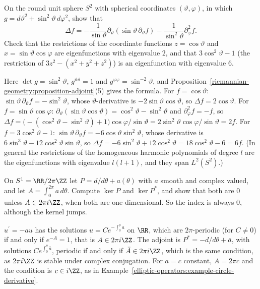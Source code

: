 \begin{exercise}\label{elliptic-operators:exercise-spherical-harmonics}
On the round unit sphere $S^2$ with spherical coordinates $(\vartheta, \varphi)$, in which $g = d\vartheta^2 + \sin^2\vartheta\,d\varphi^2$, show that
\[
\Delta f = -\frac{1}{\sin\vartheta}\partial_\vartheta(\sin\vartheta\,\partial_\vartheta f) - \frac{1}{\sin^2\vartheta}\partial_\varphi^2f .
\]
Check that the restrictions of the coordinate functions $z = \cos\vartheta$ and $x = \sin\vartheta\cos\varphi$ are eigenfunctions with eigenvalue $2$, and that $3\cos^2\vartheta - 1$ (the restriction of
$3z^2 - (x^2 + y^2 + z^2)$) is an eigenfunction with eigenvalue $6$.
\end{exercise}

\begin{solution}
Here $\det g = \sin^2\vartheta$, $g^{\vartheta\vartheta} = 1$ and $g^{\varphi\varphi} = \sin^{-2}\vartheta$, and Proposition~\ref{riemannian-geometry:proposition-adjoint}(5) gives the formula. For $f = \cos\vartheta$:
$\sin\vartheta\,\partial_\vartheta f = -\sin^2\vartheta$, whose $\vartheta$-derivative is $-2\sin\vartheta\cos\vartheta$, so $\Delta f = 2\cos\vartheta$. For $f = \sin\vartheta\cos\varphi$:
$\partial_\vartheta(\sin\vartheta\cos\vartheta) = \cos^2\vartheta - \sin^2\vartheta$ and $\partial_\varphi^2f = -f$, so
$\Delta f = \bigl(-(\cos^2\vartheta - \sin^2\vartheta) + 1\bigr)\cos\varphi/\sin\vartheta = 2\sin^2\vartheta\cos\varphi/\sin\vartheta = 2f$. For $f = 3\cos^2\vartheta - 1$: $\sin\vartheta\,\partial_\vartheta f = -6\cos\vartheta\sin^2\vartheta$,
whose derivative is $6\sin^3\vartheta - 12\cos^2\vartheta\sin\vartheta$, so $\Delta f = -6\sin^2\vartheta + 12\cos^2\vartheta = 18\cos^2\vartheta - 6 = 6f$. (In general the restrictions of the homogeneous harmonic
polynomials of degree $l$ are the eigenfunctions with eigenvalue $l(l + 1)$, and they span $L^2(S^2)$.)
\end{solution}

\begin{exercise}\label{elliptic-operators:exercise-first-order-circle}
On $S^1 = \RR/2\pi\ZZ$ let $P = d/d\theta + a(\theta)$ with $a$ smooth and complex valued, and let $A = \int_0^{2\pi}a\,d\theta$. Compute $\ker P$ and $\ker P^*$, and show that both are $0$ unless $A \in 2\pi i\ZZ$, when
both are one-dimensional. So the index is always $0$, although the kernel jumps.
\end{exercise}

\begin{solution}
$u^{\prime} = -au$ has the solutions $u = Ce^{-\int_0^\theta a}$ on $\RR$, which are $2\pi$-periodic (for $C \neq 0$) if and only if $e^{-A} = 1$, that is $A \in 2\pi i\ZZ$. The adjoint is $P^* = -d/d\theta + \bar a$, with
solutions $Ce^{\int_0^\theta\bar a}$, periodic if and only if $\bar A \in 2\pi i\ZZ$, which is the same condition, as $2\pi i\ZZ$ is stable under complex conjugation. For
$a = c$ constant, $A = 2\pi c$ and the condition is $c \in i\ZZ$, as in Example~\ref{elliptic-operators:example-circle-derivative}.
\end{solution}

